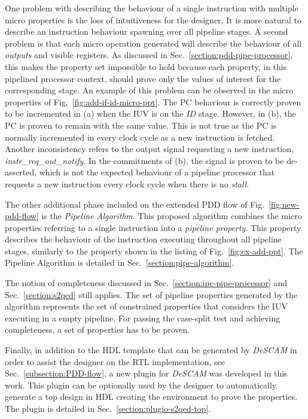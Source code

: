 One problem with describing the behaviour of a single instruction with multiple micro properties is the loss of intuitiveness for the designer. It is more natural to describe an instruction behaviour spawning over all pipeline stages. A second problem is that each micro operation generated will describe the behaviour of all \textit{outputs} and visible registers. As discussed in Sec.~\ref{section:pdd-pipe-processor}, this makes the property set impossible to hold because each property, in this pipelined processor context, should prove only the values of interest for the corresponding stage. An example of this problem can be observed in the micro properties of Fig,~\ref{fig:add-if-id-micro-ppt}. The PC behaviour is correctly proven to be incremented in (a) when the IUV is on the \textit{ID} stage. However, in (b), the PC is proven to remain with the same value. This is not true as the PC is normally incremented in every clock cycle as a new instruction is fetched. Another inconsistency refers to the output signal requesting a new instruction, \textit{instr\_req\_out\_notify}. In the  commitments of (b), the signal is proven to be de-asserted, which is not the expected behaviour of a pipeline processor that requests a new instruction every clock cycle when there is no \textit{stall}.

The other additional phase included on the extended PDD flow of Fig.~\ref{fig:new-pdd-flow} is the \textit{Pipeline Algorithm}. This proposed algorithm combines the micro properties referring to a single instruction into a \textit{pipeline property}. This property describes the behaviour of the instruction executing throughout all pipeline stages, similarly to the property shown in the listing of Fig.~\ref{fig:ex-add-ppt}. The Pipeline Algorithm is detailed in Sec.~\ref{section:pipe-algorithm}.

The notion of completeness discussed in Sec.~\ref{section:ipc-pipe-processor} and Sec.~\ref{section:s2qed} still applies. The set of pipeline properties generated by the algorithm represents the set of constrained properties that considers the IUV executing in a empty pipeline. For passing the case-split test and achieving completeness, a set of \SSQED{} properties has to be proven.

Finally, in addition to the HDL template that can be generated by \textit{DeSCAM} in order to assist the designer on the RTL implementation, see Sec.~\ref{subsection:PDD-flow}, a new plugin  for \textit{DeSCAM} was developed in this work. This plugin can be optionally used by the designer to automatically generate a top design in HDL creating the environment to prove the \SSQED{} properties. The plugin is detailed in Sec.~\ref{section:plugio-s2qed-top}.

